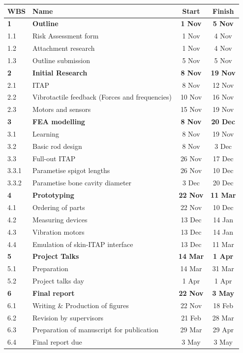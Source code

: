 \begin{table}[h]
\centering
\begin{tabular}{llcc}
    WBS & Name & Start & Finish \\ \hline
    \textbf{1} & \textbf{Outline} &\textbf{1 Nov} &\textbf{5 Nov} \\
    1.1 & Risk Assessment form &1 Nov &4 Nov  \\
    1.2 & Attachment research &1 Nov &4 Nov   \\
    1.3 & Outline submission &5 Nov &5 Nov   \\
    
    \textbf{2} & \textbf{Initial Research} &\textbf{8 Nov} &\textbf{19 Nov} \\
    2.1 & ITAP & 8 Nov &12 Nov \\
    2.2 & Vibrotactile feedback (Forces and frequencies) & 10 Nov & 16 Nov\\
    2.3 & Motors and sensors & 15 Nov & 19 Nov \\
    
    \textbf{3} & \textbf{FEA modelling} & \textbf{8 Nov} & \textbf{20 Dec}\\
    3.1 & Learning & 8 Nov & 19 Nov \\
    3.2 & Basic rod design & 8 Nov & 3 Dec \\
    3.3 & Full-out ITAP & 26 Nov & 17 Dec \\
    3.3.1 & Parametise spigot lengths & 26 Nov & 10 Dec \\
    3.3.2 & Parametise bone cavity diameter & 3 Dec & 20 Dec \\

    \textbf{4} & \textbf{Prototyping} & \textbf{22 Nov} & \textbf{11 Mar}    \\
    4.1 & Ordering of parts & 22 Nov & 10 Dec  \\
    4.2 & Measuring devices & 13 Dec & 14 Jan   \\
    4.3 & Vibration motors & 13 Dec & 14 Jan   \\
    4.4 & Emulation of skin-ITAP interface & 13 Dec & 11 Mar \\
    
    \textbf{5} & \textbf{Project Talks} & \textbf{14 Mar} & \textbf{1 Apr}   \\
    5.1 & Preparation & 14 Mar & 31 Mar    \\
    5.2 & Project talks day & 1 Apr & 1 Apr\\
    
    \textbf{6} & \textbf{Final report} &\textbf{22 Nov} &\textbf{3 May}\\
    6.1 & Writing \& Production of figures &22 Nov &18 Feb\\
    6.2 & Revision by supervisors &21 Feb &28 Mar  \\
    6.3 & Preparation of manuscript for publication &29 Mar &29 Apr\\
    6.4 & Final report due &3 May &3 May \\
\end{tabular}
\end{table}
